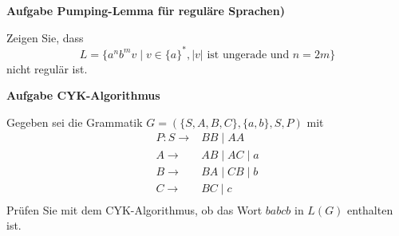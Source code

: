 \documentclass[a4paper,12pt]{article}
\newcommand{\Aufgabe}[1]{
	{
		\vspace*{0.5cm}
		\textsf{\textbf{Aufgabe #1}}
		\vspace*{0.2cm}
		
	}
}
\begin{document}
	\pagebreak
	
	\Aufgabe{Pumping-Lemma für reguläre Sprachen)}
	
	Zeigen Sie, dass
	$$L=\{a^nb^mv \mid v \in \{a\}^*, |v| \textrm{ ist ungerade und } n=2m\}$$
	nicht regulär ist.
	
	\Aufgabe{CYK-Algorithmus}
	
	Gegeben sei die Grammatik $G=(\{S, A, B, C\}, \{a, b\}, S, P)$ mit
	\begin{align*}
		P:S\rightarrow & BB \mid AA\\
		A\rightarrow & AB \mid AC \mid a\\
		B\rightarrow & BA \mid CB \mid b\\
		C\rightarrow & BC \mid c\\
	\end{align*}
	Prüfen Sie mit dem CYK-Algorithmus, ob das Wort $babcb$ in $L(G)$ enthalten ist.
	
\end{document}
